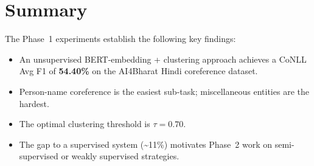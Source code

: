 \documentclass[12pt,a4paper]{article}
\begin{document}
\section{Summary}

The Phase~1 experiments establish the following key findings:

\begin{itemize}
    \item An unsupervised BERT-embedding + clustering approach achieves
          a CoNLL Avg F1 of \textbf{54.40\%} on the AI4Bharat Hindi
          coreference dataset.
    \item Person-name coreference is the easiest sub-task; miscellaneous
          entities are the hardest.
    \item The optimal clustering threshold is $\tau = 0.70$.
    \item The gap to a supervised system (\textasciitilde11\%) motivates
          Phase~2 work on semi-supervised or weakly supervised strategies.
\end{itemize}
\end{document}

